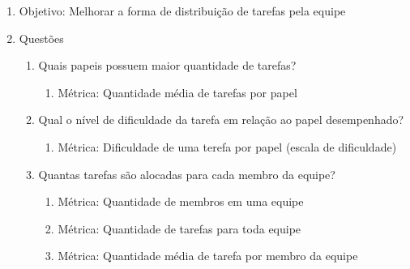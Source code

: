 \documentclass{article}
\begin{document}
	\begin{enumerate}
	\item Objetivo: Melhorar a forma de distribuição de tarefas pela equipe
	\item Questões
		\begin{enumerate}
		\item Quais papeis possuem maior quantidade de tarefas?
			\begin{enumerate}
			\item Métrica: Quantidade média de tarefas por papel
			\end{enumerate}
		\item Qual o nível de dificuldade da tarefa em relação ao papel desempenhado?
			\begin{enumerate}
			\item Métrica: Dificuldade de uma terefa por papel (escala de dificuldade)
			\end{enumerate}
		\item Quantas tarefas são alocadas para cada membro da equipe?
			\begin{enumerate}
			\item Métrica: Quantidade de membros em uma equipe
			\item Métrica: Quantidade de tarefas para toda equipe
			\item Métrica: Quantidade média de tarefa por membro da equipe
			\end{enumerate}
		\end{enumerate}
	\end{enumerate}
\end{document}
